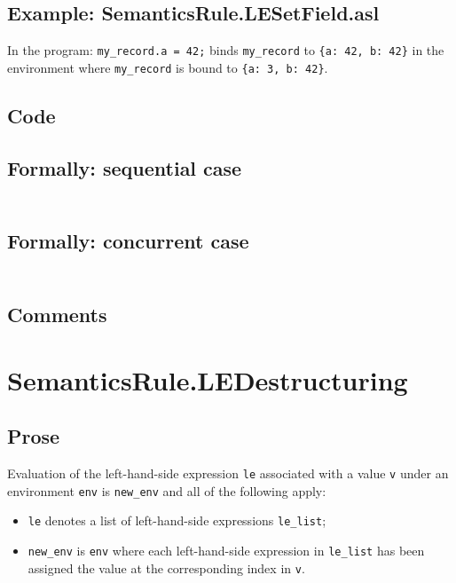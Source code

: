 \documentclass{book}
\begin{document}
    \subsection{Example: SemanticsRule.LESetField.asl}
    In the program:
    \texttt{my\_record.a = 42;} binds \texttt{my\_record} to \texttt{\{a: 42, b: 42\}} in the environment where \texttt{my\_record} is bound to \texttt{\{a: 3, b: 42\}}.

  \subsection{Code}

  \subsection{Formally: sequential case}
  \begin{align}
  \end{align} 

  \subsection{Formally: concurrent case}
  \begin{align}
  \end{align} 

  \subsection{Comments}

\section{SemanticsRule.LEDestructuring \label{sec:SemanticsRule.LEDestructuring}}

    \subsection{Prose}
    Evaluation of the left-hand-side expression \texttt{le} associated with a
value \texttt{v} under an environment \texttt{env} is \texttt{new\_env} and all
of the following apply:
    \begin{itemize}
    \item \texttt{le} denotes a list of left-hand-side expressions \texttt{le\_list};
    \item \texttt{new\_env} is \texttt{env} where each left-hand-side expression in \texttt{le\_list} has
      been assigned the value at the corresponding index in \texttt{v}.
    \end{itemize}
\end{document}
